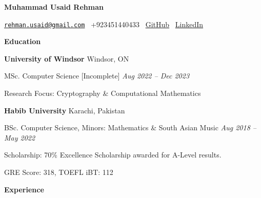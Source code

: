 \documentclass[12pt, a4paper]{article}
\begin{document}
{}\selectfont

\begin{center}
    \Large\textbf{Muhammad Usaid Rehman}\\ 
    \hrulefill
\end{center}

\begin{center}
    \href{mailto:rehman.usaid@gmail.com}{\texttt{rehman.usaid@gmail.com}} \textbullet \ +923451440433 \textbullet \ \href{https://github.com/m-usaid99}{GitHub} \textbullet \ \href{https://www.linkedin.com/in/muhammad-usaid-rehman-aa8b64202/}{LinkedIn}
\end{center}

\begin{center}
    \large\textbf{Education}
\end{center}

\textbf{University of Windsor} \hfill Windsor, ON

MSc. Computer Science [Incomplete] \hfill \textit{Aug 2022 -- Dec 2023}

Research Focus: Cryptography \& Computational Mathematics



\vspace{12pt}
\textbf{Habib University} \hfill Karachi, Pakistan

BSc. Computer Science, Minors: Mathematics \& South Asian Music \hfill \textit{Aug 2018 -- May 2022}

Scholarship: 70\% Excellence Scholarship awarded for A-Level results.


GRE Score: 318, TOEFL iBT: 112






\begin{center}
    \large\textbf{Experience}
\end{center}
\end{document}
